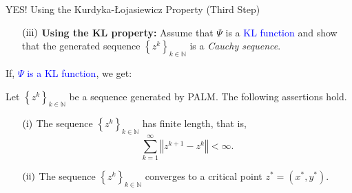 \documentclass[9pt,handout]{beamer} %
\newcommand{\norm}[1]{\left\Vert {#1} \right\Vert} %
\newcommand{\Seq}[2]{\left\{{#1}^{{#2}}\right\}_{{#2} \in \mathbb{N}}}
\begin{document}
    \begin{frame}{\large{YES! Using the Kur\-dy\-ka-{\L}o\-ja\-sie\-wicz Property (Third 
    Step)}}
    	\vspace{0.1in}
        \begin{itemize}
            \item[$\rm{(iii)}$] {\bf Using the KL property:} Assume that $\Psi$ is a 
            \textcolor{blue}{KL function} and show that the generated sequence $\Seq{z}{k}$ 
            is a {\em Cauchy sequence}.
        \end{itemize}
        \pause
        \vspace{0.08in}

        If, \textcolor{blue}{$\Psi$ is a KL function}, we get:
        \pause
        \vspace{0.1in}
        \begin{theorem}
            Let $\Seq{z}{k}$ be a sequence generated by PALM. The following assertions hold.
            \begin{itemize}
                \item[$\rm{(i)}$] The sequence $\Seq{z}{k}$ has finite length, that is,
                    \begin{equation*}
                        \sum_{k = 1}^{\infty} \norm{z^{k + 1} - z^{k}} < \infty.
                    \end{equation*}
                \pause
                \item[$\rm{(ii)}$] The sequence $\Seq{z}{k}$ converges to a critical point 
                	$z^{\ast} = \left(x^{\ast} , y^{\ast}\right)$.
            \end{itemize}
        \end{theorem}
    \end{frame}
\end{document}
